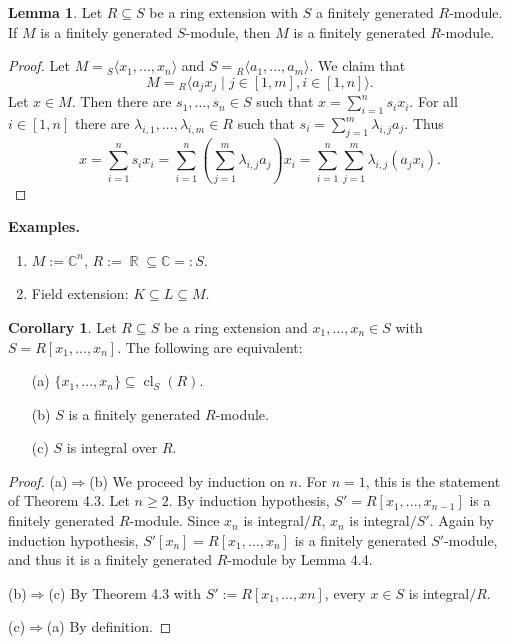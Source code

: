 \documentclass[12pt,a4paper]{report}
\theoremstyle{definition}
\newtheorem{corollary}[theorem]{Corollary} %
\newtheorem{lemma}[theorem]{Lemma}
\theoremstyle{num.custom-title}
\DeclareMathOperator{\R}{\mathbb{R}}
\DeclareMathOperator{\imp}{\Rightarrow}
\DeclareMathOperator{\sse}{\subseteq}
\DeclareMathOperator{\cl}{cl}
\newcommand{\C}{\mathbb{C}}
\begin{document}
\begin{lemma}
Let $R \sse S$ be a ring extension with $S$ a finitely generated $R$-module. If $M$ is a finitely generated $S$-module, then $M$ is a finitely generated $R$-module.
\begin{proof}
Let $M= {}_S \langle x_1,...,x_n \rangle$ and $S = {}_R \langle a_1,...,a_m \rangle$. We claim that 
\[
M = {}_R \langle a_j x_j \mid j \in [1,m], i \in [1,n] \rangle.
\]
Let $x \in M$. Then there are $s_1,...,s_n \in S$ such that $x = \sum_{i=1}^n s_i x_i$. For all $i \in [1,n]$ there are $\lambda_{i,1},...,\lambda_{i,m} \in R$ such that $s_i = \sum_{j=1}^m \lambda_{i,j} a_j$. Thus
\[
x = \sum_{i=1}^n s_i x_i = \sum_{i=1}^n \left( \sum_{j=1}^m \lambda_{i,j} a_j \right) x_i = \sum_{i=1}^n \sum_{j=1}^m \lambda_{i,j} (a_j x_i).
\]
\end{proof}
\end{lemma}

\noindent\textbf{Examples.}
\begin{enumerate}
\item $M:=\C^n$, $R := \R \sse \C =: S$.
\item Field extension: $K \sse L \sse M$.
\end{enumerate}

\begin{corollary}
Let $R \sse S$ be a ring extension and $x_1,...,x_n \in S$ with $S=R[x_1,...,x_n]$. The following are equivalent:
\begin{itemize}
\item[(a)] $\{x_1,...,x_n\} \sse \cl_S(R)$.
\item[(b)] $S$ is a finitely generated $R$-module.
\item[(c)] $S$ is integral over $R$.
\end{itemize}
\begin{proof}
\item[(a)$\imp$(b)] We proceed by induction on $n$. For $n=1$, this is the statement of Theorem 4.3. Let $n \geq 2$. By induction hypothesis, $S'=R[x_1,...,x_{n-1}]$ is a finitely generated $R$-module. Since $x_n$ is integral$/R$, $x_n$ is integral$/S'$. Again by induction hypothesis, $S'[x_n]=R[x_1,...,x_n]$ is a finitely generated $S'$-module, and thus it is a finitely generated $R$-module by Lemma 4.4.
\item[(b)$\imp$(c)] By Theorem 4.3 with $S' := R[x_1,...,xn]$, every $x \in S$ is integral$/R$.
\item[(c)$\imp$(a)] By definition.
\end{proof}
\end{corollary}
\end{document}
